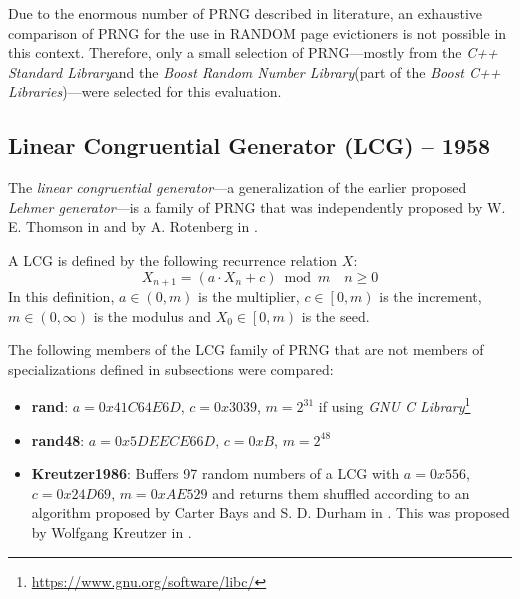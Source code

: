     Due to the enormous number of PRNG described in literature, an exhaustive comparison of PRNG for the use in RANDOM page evictioners is not possible in this context. Therefore, only a small selection of PRNG---mostly from the \textit{C++ Standard Library}\footnotemark[1] and the \textit{Boost Random Number Library}\footnotemark[2] (part of the \textit{Boost C++ Libraries}\footnotemark[3])---were selected for this evaluation.


\subsection[Linear Congruential Generator (LCG) -- 1958]{Linear Congruential Generator (LCG) -- 1958} \label{subsec:lcg}

    The \emph{linear congruential generator}---a generalization of the earlier proposed \emph{Lehmer generator}---is a family of PRNG that was independently proposed by W. E. Thomson in \cite{Thomson:1958} and by A. Rotenberg in \cite{Rotenberg:1960}.

    A LCG is defined by the following recurrence relation $X$:
    \begin{equation*}
        X_{n + 1} = \left(a \cdot X_n + c\right) \bmod m \quad n \geq 0
    \end{equation*}
    In this definition, $a \in \left(0, m\right)$ is the multiplier, $c \in \left[0, m\right)$ is the increment, $m \in \left(0, \infty\right)$ is the modulus and $X_0 \in \left[0, m\right)$ is the seed.

    The following members of the LCG family of PRNG that are not members of specializations defined in subsections were compared:
    \begin{itemize}
		\itemsep0em
        \item \textbf{rand}: $a = 0x41C64E6D$, $c = 0x3039$, $m = 2^{31}$ if using \textit{GNU C Library}\footnote[4]{\url{https://www.gnu.org/software/libc/}}
        \item \textbf{rand48}: $a = 0x5DEECE66D$, $c = 0xB$, $m = 2^{48}$
        \item \textbf{Kreutzer1986}: Buffers 97 random numbers of a LCG with $a = 0x556$, $c = 0x24D69$, $m = 0xAE529$ and returns them shuffled according to an algorithm proposed by Carter Bays and S. D. Durham in \cite{Bays:1976}. This was proposed by Wolfgang Kreutzer in \cite{Kreutzer:1986}.
    \end{itemize}

